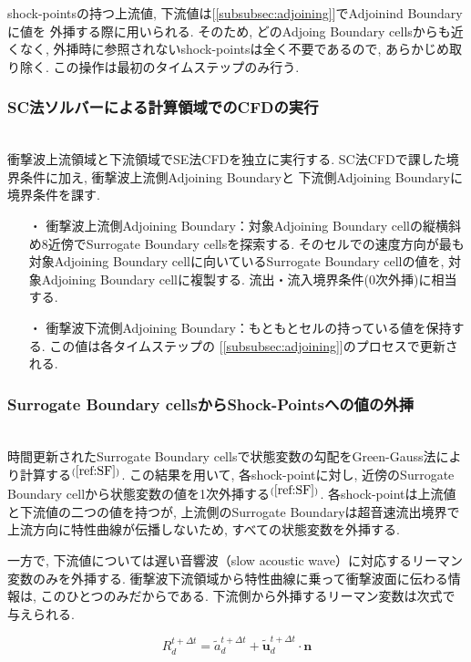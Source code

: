 \documentclass[a4j]{jarticle}
\begin{document}
shock-pointsの持つ上流値, 下流値は[\ref{subsubsec:adjoining}]でAdjoinind Boundaryに値を
外挿する際に用いられる. そのため, どのAdjoing Boundary cellsからも近くなく, 外挿時に参照されないshock-pointsは全く不要であるので,
あらかじめ取り除く. この操作は最初のタイムステップのみ行う.

\subsubsection{SC法ソルバーによる計算領域でのCFDの実行} \label{subsubsec:sc}
\mbox{}\\[-1.0ex]
衝撃波上流領域と下流領域でSE法CFDを独立に実行する. SC法CFDで課した境界条件に加え, 衝撃波上流側Adjoining Boundaryと
下流側Adjoining Boundaryに境界条件を課す.
\begin{itemize}
  \item[・]  衝撃波上流側Adjoining Boundary：対象Adjoining Boundary cellの縦横斜め8近傍でSurrogate Boundary cellsを探索する. 
            そのセルでの速度方向が最も対象Adjoining Boundary cellに向いているSurrogate Boundary cellの値を, 対象Adjoining Boundary cellに複製する. 流出・流入境界条件(0次外挿)に相当する.
  \item[・]  衝撃波下流側Adjoining Boundary：もともとセルの持っている値を保持する. この値は各タイムステップの
            [\ref{subsubsec:adjoining}]のプロセスで更新される.
\end{itemize}

\subsubsection{Surrogate Boundary cellsからShock-Pointsへの値の外挿} \label{subsubsec:extrapolate}
\mbox{}\\[-1.0ex]

時間更新されたSurrogate Boundary cellsで状態変数の勾配をGreen-Gauss法により計算する$^{(\ref{ref:SF})}$.
この結果を用いて, 各shock-pointに対し, 近傍のSurrogate Boundary cellから状態変数の値を1次外挿する$^{(\ref{ref:SF})}$.
各shock-pointは上流値と下流値の二つの値を持つが,
上流側のSurrogate Boundaryは超音速流出境界で上流方向に特性曲線が伝播しないため, 
すべての状態変数を外挿する.

一方で, 下流値については遅い音響波（slow acoustic wave）に対応するリーマン変数のみを外挿する.
衝撃波下流領域から特性曲線に乗って衝撃波面に伝わる情報は, このひとつのみだからである.
下流側から外挿するリーマン変数は次式で与えられる.

\begin{equation}
    R_d^{t+\Delta t} = \tilde{a}_d^{t+\Delta t} + \tilde{\mathbf{u}}_d^{t+\Delta t} \cdot \mathbf{n}
    \label{eq:Riemann_down}
\end{equation}
\end{document}

